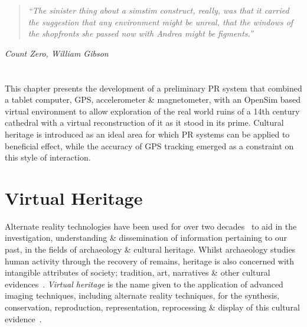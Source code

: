 \begin{quote}
	\textit{``The sinister thing about a simstim construct, really, was that it carried the suggestion that any environment might be unreal, that the windows of the shopfronts she passed now with Andrea might be figments.''}
\end{quote}
\hfill \textit{Count Zero, William Gibson}
\\
\\
\\


This chapter presents the development of a preliminary PR system that combined a tablet computer, GPS, accelerometer \& magnetometer, with an OpenSim based virtual environment to allow exploration of the real world ruins of a 14th century cathedral with a virtual reconstruction of it as it stood in its prime. Cultural heritage is introduced as an ideal area for which PR systems can be applied to beneficial effect, while the accuracy of GPS tracking emerged as a constraint on this style of interaction.


\section{Virtual Heritage}

Alternate reality technologies have been used for over two decades~\cite{Roussou2002} to aid in the investigation, understanding \& dissemination of information pertaining to our past, in the fields of archaeology \& cultural heritage. Whilst archaeology studies human activity through the recovery of remains, heritage is also concerned with intangible attributes of society; tradition, art, narratives \& other cultural evidences~\cite{Roussou2002}. \textit{Virtual heritage} is the name given to the application of advanced imaging techniques, including alternate reality techniques, for the synthesis, conservation, reproduction, representation, reprocessing \& display of this cultural evidence~\cite{roussou:photorealism}.


